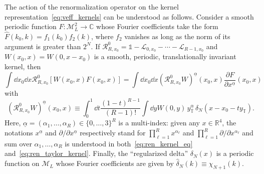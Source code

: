 \documentclass[a4paper, 11pt]{article}
\newcommand{\C}{\mathbb{C}}
\newcommand{\R}{\mathbb{R}}
\newcommand{\id}{\mathds{1}}								%
\newcommand{\loc}{\mathcal{L}}								%
\newcommand{\ren}{\mathcal{R}}								%
\newcommand{\kren}{\mathscr{R}}								%
\newcommand{\torus}{{\scriptstyle{\mathbb{T}}}}				%
\theoremstyle{thm}
\begin{document}
The action of the renormalization operator on the kernel representation~\eqref{eq:veff_kernels} can be understood as follows. Consider a smooth periodic function $F \colon \mathcal{M}_L^2 \to \C$ whose Fourier coefficients take the form $\hat{F}(k_0, k) = f_1(k_0) f_2(k)$, where $f_2$ vanishes as long as the norm of its argument is greater than $2^N$. If $\ren^0_{R, x_0} = \id - \loc_{0, x_0} - \cdots - \loc_{R-1, x_0}$ and $W(x_0, x) = W(0, x - x_0)$ is a smooth, periodic, translationally invariant kernel, then
\begin{equation}
\label{eq:ren_kernel_eq}
\int \dd{x_0} \dd{x} \ren^0_{R, x_0} [W(x_0, x) F(x_0, x)] = \int \dd{x_0} \dd{x} (\kren^0_{R, x_0} W)^{\underline{\alpha}}(x_0, x) \frac{\partial F}{\partial x^{\underline{\alpha}}}(x_0, x)
\end{equation}
with
\begin{equation}
\label{eq:ren_taylor_kernel}
(\kren^0_{R, x_0} W)^{\underline{\alpha}}(x_0, x) \equiv \int_0^1 \dd{t} \frac{(1-t)^{R-1}}{(R-1)!} \int \dd{y} W(0,y) \, y^{\underline{\alpha}}_\torus \, 
\delta_N(x - x_0 - t y_\torus).
\end{equation}
Here, $\underline{\alpha} = (\alpha_1, \dots, \alpha_R) \in \lbrace 0, \dots, 3 \rbrace^R$ is a multi-index: given any $x \in \R^4$, the notations $x^{\underline{\alpha}}$ and $\partial/\partial x^{\underline{\alpha}}$ respectively stand for $\prod_{\ell = 1}^R x^{\alpha_\ell}$ and $\prod_{\ell = 1}^R \partial/\partial x^{\alpha_\ell}$ and sum over $\alpha_1, \dots, \alpha_R$ is understood in both~\eqref{eq:ren_kernel_eq} and~\eqref{eq:ren_taylor_kernel}. Finally, the ``regularized delta'' $\delta_N(x)$ is a periodic function on $\mathcal{M}_L$ whose Fourier coefficients are given by $\hat{\delta}_N(k) \equiv \chi_{N+1}(k)$.
\end{document}
